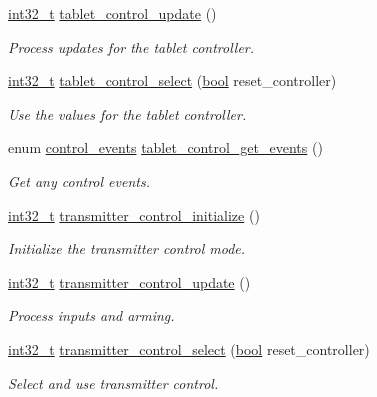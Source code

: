 \begin{DoxyCompactItemize}
\hyperlink{group___n_a_m_e_gafd12020da5a235dfcf0c3c748fb5baed}{int32\-\_\-t} \hyperlink{group___control_ga0bee0c81342526c03f10559cf6dbda72}{tablet\-\_\-control\-\_\-update} ()
\begin{DoxyCompactList}\small\item\em Process updates for the tablet controller. \end{DoxyCompactList}\item 
\hyperlink{group___n_a_m_e_gafd12020da5a235dfcf0c3c748fb5baed}{int32\-\_\-t} \hyperlink{group___control_ga72ecc808e52960fdd4fc2fe42bf5f633}{tablet\-\_\-control\-\_\-select} (\hyperlink{group___exported__types_gaf6a258d8f3ee5206d682d799316314b1}{bool} reset\-\_\-controller)
\begin{DoxyCompactList}\small\item\em Use the values for the tablet controller. \end{DoxyCompactList}\item 
enum \hyperlink{group___control_ga6db279174b366abaad3f5de70b10655c}{control\-\_\-events} \hyperlink{group___control_gaac5e3efaaa07ab552af74fecf4726748}{tablet\-\_\-control\-\_\-get\-\_\-events} ()
\begin{DoxyCompactList}\small\item\em Get any control events. \end{DoxyCompactList}\item 
\hyperlink{group___n_a_m_e_gafd12020da5a235dfcf0c3c748fb5baed}{int32\-\_\-t} \hyperlink{group___control_ga27653bb9e2abe9498b31e9f748f158d8}{transmitter\-\_\-control\-\_\-initialize} ()
\begin{DoxyCompactList}\small\item\em Initialize the transmitter control mode. \end{DoxyCompactList}\item 
\hyperlink{group___n_a_m_e_gafd12020da5a235dfcf0c3c748fb5baed}{int32\-\_\-t} \hyperlink{group___control_gad28dba2f07e1f4fe872ccf01941c3c84}{transmitter\-\_\-control\-\_\-update} ()
\begin{DoxyCompactList}\small\item\em Process inputs and arming. \end{DoxyCompactList}\item 
\hyperlink{group___n_a_m_e_gafd12020da5a235dfcf0c3c748fb5baed}{int32\-\_\-t} \hyperlink{group___control_ga6ffb050d1f10ab7aa441ce65629e26bd}{transmitter\-\_\-control\-\_\-select} (\hyperlink{group___exported__types_gaf6a258d8f3ee5206d682d799316314b1}{bool} reset\-\_\-controller)
\begin{DoxyCompactList}\small\item\em Select and use transmitter control. \end{DoxyCompactList}\item 

\end{DoxyCompactItemize}
